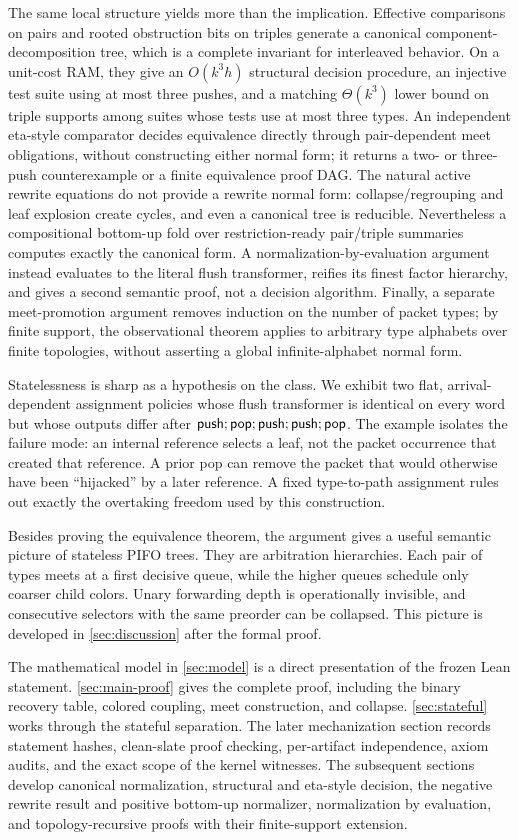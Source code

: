 The same local structure yields more than the implication.  Effective
comparisons on pairs and rooted obstruction bits on triples generate a
canonical component-decomposition tree, which is a complete invariant for
interleaved behavior.  On a unit-cost RAM, they give an \(O(k^3h)\) structural
decision procedure, an injective test suite using at most three pushes, and a matching
\(\Theta(k^3)\) lower bound on triple supports among suites whose tests use at
most three types.  An independent eta-style comparator decides equivalence
directly through pair-dependent meet obligations, without constructing either
normal form; it returns a two- or three-push counterexample or a finite
equivalence proof DAG.  The natural active rewrite equations do not provide a
rewrite normal form: collapse/regrouping and leaf explosion create cycles, and
even a canonical tree is reducible.  Nevertheless a compositional bottom-up
fold over restriction-ready pair/triple summaries computes exactly the
canonical form.  A normalization-by-evaluation argument instead evaluates to
the literal flush transformer, reifies its finest factor hierarchy, and gives
a second semantic proof, not a decision algorithm.  Finally, a separate
meet-promotion argument removes induction on the number of packet types; by
finite support, the observational theorem applies to arbitrary type alphabets
over finite topologies, without asserting a global infinite-alphabet normal
form.

Statelessness is sharp as a hypothesis on the class.  We exhibit two flat,
arrival-dependent assignment policies whose flush transformer is identical on
every word but whose outputs differ after
\(\mathsf{push};\mathsf{pop};\mathsf{push};\mathsf{push};\mathsf{pop}\).  The example isolates the failure mode:
an internal reference selects a leaf, not the packet occurrence that created
that reference.  A prior pop can remove the packet that would otherwise have
been ``hijacked'' by a later reference.  A fixed type-to-path assignment rules
out exactly the overtaking freedom used by this construction.

Besides proving the equivalence theorem, the argument gives a useful semantic
picture of stateless PIFO trees.  They are arbitration hierarchies.  Each pair
of types meets at a first decisive queue, while the higher queues schedule only
coarser child colors.  Unary forwarding depth is operationally invisible, and
consecutive selectors with the same preorder can be collapsed.  This picture
is developed in \autoref{sec:discussion} after the formal proof.

The mathematical model in \autoref{sec:model} is a direct presentation of the
frozen Lean statement.  \autoref{sec:main-proof} gives the complete proof,
including the binary recovery table, colored coupling, meet construction, and
collapse.  \autoref{sec:stateful} works through the stateful separation.
The later mechanization section records statement hashes, clean-slate proof
checking, per-artifact independence, axiom audits, and the exact scope of the
kernel witnesses.  The
subsequent sections develop canonical normalization, structural and eta-style
decision, the negative rewrite result and positive bottom-up normalizer,
normalization by evaluation, and topology-recursive proofs with their
finite-support extension.
